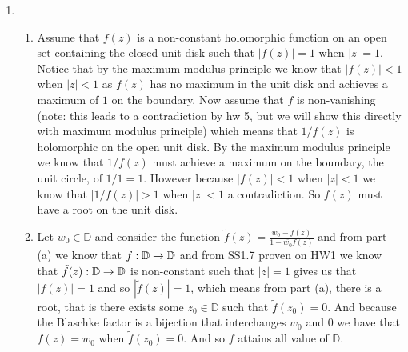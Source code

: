 \documentclass[12pt]{amsart}
\begin{document}
\begin{enumerate}
\item 
\begin{enumerate}
    \item Assume that $f(z)$ is a non-constant holomorphic function on an open set containing the closed unit disk such that $|f(z)|=1$ when $|z|=1$. Notice that by the maximum modulus principle we know that $|f(z)|<1$ when $|z|<1$ as $f(z)$ has no maximum in the unit disk and achieves a maximum of $1$ on the boundary. Now assume that $f$ is non-vanishing (note: this leads to a contradiction by hw 5, but we will show this directly with maximum modulus principle) which means that $1/f(z)$ is holomorphic on the open unit disk. By the maximum modulus principle we know that $1/f(z)$ must achieve a maximum on the boundary, the unit circle, of $1/1=1$. However because $|f(z)|<1$ when $|z|<1$ we know that $|1/f(z)|>1$ when $|z|<1$ a contradiction. So $f(z)$ must have a root on the unit disk.\\

\item Let $w_0\in\mathbb{D}$ and consider the function $\tilde{f}(z)=\displaystyle{\frac{w_0-f(z)}{1-\overline{w_0}f(z)}}$ and from part (a) we know that $f:\mathbb{D}\rightarrow\mathbb{D}$ and from SS1.7 proven on HW1 we know that $\tilde{f}(z):\mathbb{D}\rightarrow\mathbb{D}$ is non-constant such that $|z|=1$ gives us that $|f(z)|=1$ and so $|\tilde{f}(z)|=1$, which means from part (a), there is a root, that is there exists some $z_0\in\mathbb{D}$ such that $\tilde{f}(z_0)=0$. And because the Blaschke factor is a bijection that interchanges $w_0$ and $0$ we have that $f(z)=w_0$ when $\tilde{f}(z_0)=0$. And so $f$ attains all value of $\mathbb{D}$.\\

\end{enumerate}
\end{enumerate}
\end{document}
